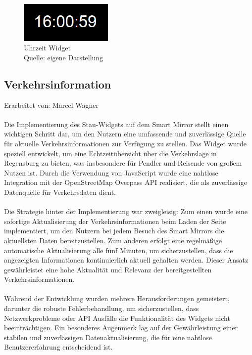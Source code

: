 \begin{figure}[h]
    \centering
    \includegraphics[width=0.4\textwidth]{pictures/time_widget.png}
  \captionsetup{justification=centering, labelformat=simple, singlelinecheck=false}
    \caption[Uhrzeit Widget]{Uhrzeit Widget\\ Quelle: eigene Darstellung}
\end{figure}

\subsection{Verkehrsinformation}
Erarbeitet von: Marcel Wagner \\ \\
\noindent
Die Implementierung des Stau-Widgets auf dem Smart Mirror stellt einen wichtigen Schritt dar, um den Nutzern eine umfassende und zuverlässige Quelle für aktuelle Verkehrsinformationen zur Verfügung zu stellen. Das Widget wurde speziell entwickelt, um eine Echtzeitübersicht über die Verkehrslage in Regensburg zu bieten, was insbesondere für Pendler und Reisende von großem Nutzen ist. Durch die Verwendung von JavaScript wurde eine nahtlose Integration mit der OpenStreetMap Overpass API realisiert, die als zuverlässige Datenquelle für Verkehrsdaten dient. \\ \\
\noindent
Die Strategie hinter der Implementierung war zweigleisig: Zum einen wurde eine sofortige Aktualisierung der Verkehrsinformationen beim Laden der Seite implementiert, um den Nutzern bei jedem Besuch des Smart Mirrors die aktuellsten Daten bereitzustellen. Zum anderen erfolgt eine regelmäßige automatische Aktualisierung alle fünf Minuten, um sicherzustellen, dass die angezeigten Informationen kontinuierlich aktuell gehalten werden. Dieser Ansatz gewährleistet eine hohe Aktualität und Relevanz der bereitgestellten Verkehrsinformationen. \\ \\
\noindent
Während der Entwicklung wurden mehrere Herausforderungen gemeistert, darunter die robuste Fehlerbehandlung, um sicherzustellen, dass Netzwerkprobleme oder API Ausfälle die Funktionalität des Widgets nicht beeinträchtigen. Ein besonderes Augenmerk lag auf der Gewährleistung einer stabilen und zuverlässigen Datenaktualisierung, die für eine nahtlose Benutzererfahrung entscheidend ist. \\ \\
